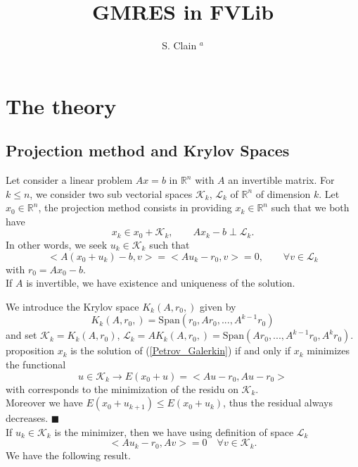 \documentclass[12pt,a4 paper]{article}
\title{GMRES in FVLib}
\author{ S. Clain $^a$}
\begin{document}
\maketitle
\section{The theory}
\subsection{Projection method and Krylov Spaces}
Let consider a linear problem $Ax=b$ in $\mathbb R^n$ with $A$ an invertible matrix.
For $k\leq n$, we consider two sub vectorial spaces $\mathcal K_k$, $\mathcal L_k$ of $\mathbb R^n$ of dimension $k$.
Let $x_0\in\mathbb R^n$, the projection method consists in providing $x_k\in \mathbb R^n$ such that we both have
$$
x_k\in x_0+\mathcal K_k, \qquad Ax_k-b \perp \mathcal L_k.
$$
In other words, we seek $u_k\in\mathcal K_k$ such that
\begin{equation}
<A(x_0+u_k)-b,v>=<Au_k-r_0,v>=0,\qquad \forall v\in \mathcal L_k \label{Petrov_Galerkin}
\end{equation}
with $r_0=Ax_0-b$.\\
If $A$ is invertible, we have existence and uniqueness of the solution.

We introduce the Krylov space $K_k(A,r_0,)$ given by
$$
K_k(A,r_0,)=\textrm{Span}(r_0,Ar_0,...,A^{k-1}r_0)
$$ 
and set  $\mathcal K_k=K_k(A,r_0)$, $\mathcal L_k=AK_k(A,r_0,)=\textrm{Span}(Ar_0,...,A^{k-1}r_0,A^kr_0)$.\\

{\sc proposition}
$x_k$ is the solution of (\ref{Petrov_Galerkin}) if and only if $x_k$ minimizes the functional
\begin{equation}
u\in\mathcal K_k \to  E(x_0+u)=<Au-r_0,Au-r_0> \label{minimize_functional}
\end{equation}
with corresponds to the minimization of the residu on $\mathcal K_k$.\\
Moreover we have  $E(x_0+u_{k+1})\leq E(x_0+u_{k})$, thus the residual always decreases.
$\blacksquare$\\

\noindent If $u_k\in \mathcal K_k$ is the minimizer, then we have using definition of space $\mathcal L_k$
\begin{equation}
<Au_k-r_0,Av>=0 \quad \forall v\in \mathcal K_k. \label{minimizer}
\end{equation} 
We have the following result.\\
\end{document}
